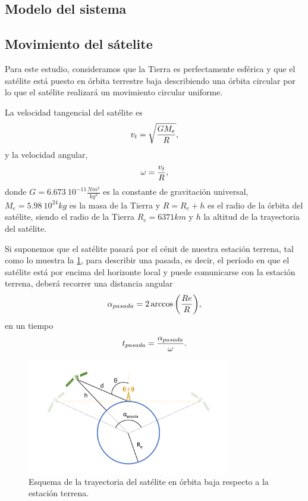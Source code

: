 \documentclass{article}
\newenvironment{standalone}{\begin{preview}}{\end{preview}}
\begin{document}
\begin{standalone}
  \section{Modelo del sistema} \label{sec:modelo-senales}

  \subsection{Movimiento del sátelite}

  Para este estudio, consideramos que la Tierra es perfectamente esférica y que el satélite está puesto en órbita terrestre baja describiendo una órbita circular por lo que el satélite realizará un movimiento circular uniforme.

  La velocidad tangencial del satélite es
  \begin{equation}
    v_t = \sqrt{\frac{G M_e}{R}},
    \tagaddtext{[\si{\meter\per\second}]}
  \end{equation}
  y la velocidad angular,
  \begin{equation}
    \omega = \frac{v_t}{R},
    \tagaddtext{[\si{\radian\per\second}]}
  \end{equation}
  donde $G = 6.673 \ 10^{-11} \frac{N m^2}{kg^2} $ es la constante de gravitación universal, $M_e = 5.98 \ 10^{24} kg$ es la masa de la Tierra y $R = R_e + h$ es el radio de la órbita del satélite, siendo el radio de la Tierra $R_e = 6371 km$ y $h$ la altitud de la trayectoria del satélite.

  Si suponemos que el satélite pasará por el cénit de nuestra estación terrena, tal como lo muestra la \cref{fig:esquema_satelite_antena}, para describir una pasada, es decir, el período en que el satélite está por encima del horizonte local y puede comunicarse con la estación terrena, deberá recorrer una distancia angular \cite{ippolitojr2008}
  \begin{equation}
    \alpha_{pasada} = 2 \arccos{ \left( \frac{Re}{R} \right) },
    \tagaddtext{[\si{\radian}]}
  \end{equation}
  en un tiempo
  \begin{equation}
    t_{pasada} = \frac{\alpha_{pasada}}{\omega}.
    \tagaddtext{[\si{\second}]}
  \end{equation}

  \begin{figure}[!htbp]
    \centering
    \includegraphics[trim=90pt 40pt 90pt 40pt, clip, width=\linewidth, height=50mm, keepaspectratio]{../images/movimiento-satelite.pdf}
    \caption{Esquema de la trayectoria del satélite en órbita baja respecto a la estación terrena.}
    \label{fig:esquema_satelite_antena}
  \end{figure}


\end{standalone}
\end{document}
